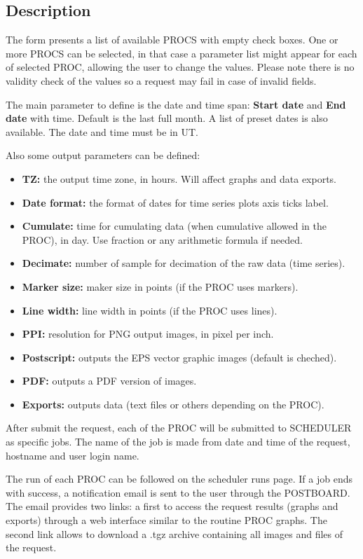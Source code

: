 \subsection{Description}

The form presents a list of available PROCS with empty check boxes. One or more PROCS can be selected, in that case a parameter list might appear for each of selected PROC, allowing the user to change the values. Please note there is no validity check of the values so a request may fail in case of invalid fields.

The main parameter to define is the date and time span: \textbf{Start date} and \textbf{End date} with time. Default is the last full month. A list of preset dates is also available. The date and time must be in UT. 

Also some output parameters can be defined:
\begin{itemize}
\item \textbf{TZ:} the output time zone, in hours. Will affect graphs and data exports.
\item \textbf{Date format:} the format of dates for time series plots axis ticks label.
\item \textbf{Cumulate:} time for cumulating data (when cumulative allowed in the PROC), in day. Use fraction or any arithmetic formula if needed.
\item \textbf{Decimate:} number of sample for decimation of the raw data (time series).
\item \textbf{Marker size:} maker size in points (if the PROC uses markers).
\item \textbf{Line width:} line width in points (if the PROC uses lines).
\item \textbf{PPI:} resolution for PNG output images, in pixel per inch.
\item \textbf{Postscript:} outputs the EPS vector graphic images (default is cheched).
\item \textbf{PDF:} outputs a PDF version of images.
\item \textbf{Exports:} outputs data (text files or others depending on the PROC).
\end{itemize}

After submit the request, each of the PROC will be submitted to SCHEDULER as specific jobs. The name of the job is made from date and time of the request, hostname and user login name.

The run of each PROC can be followed on the scheduler runs page. If a job ends with success, a notification email is sent to the user through the POSTBOARD. The email provides two links: a first to access the request results (graphs and exports) through a web interface similar to the routine PROC graphs. The second link allows to download a .tgz archive containing all images and files of the request.

